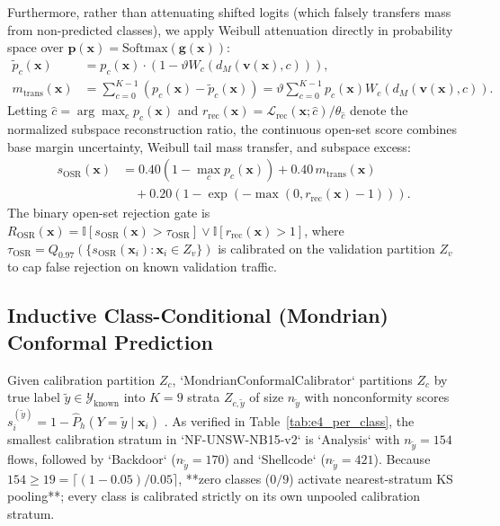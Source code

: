 ﻿\documentclass[conference]{IEEEtran}
\begin{document}
Furthermore, rather than attenuating shifted logits (which falsely transfers mass from non-predicted classes), we apply Weibull attenuation directly in probability space over $\mathbf{p}(\mathbf{x}) = \text{Softmax}(\mathbf{g}(\mathbf{x}))$:
\begin{align}
\tilde{p}_c(\mathbf{x}) &= p_c(\mathbf{x}) \cdot \left(1 - \vartheta W_c(d_M(\mathbf{v}(\mathbf{x}), c))\right), \label{eq:prob_atten} \\
m_{\text{trans}}(\mathbf{x}) &= \sum_{c=0}^{K-1} \left(p_c(\mathbf{x}) - \tilde{p}_c(\mathbf{x})\right) = \vartheta \sum_{c=0}^{K-1} p_c(\mathbf{x}) W_c(d_M(\mathbf{v}(\mathbf{x}), c)). \label{eq:trans_mass}
\end{align}
Letting $\hat{c} = \arg\max_{c} p_c(\mathbf{x})$ and $r_{\text{rec}}(\mathbf{x}) = \mathcal{L}_{\text{rec}}(\mathbf{x}; \hat{c}) / \theta_{\hat{c}}$ denote the normalized subspace reconstruction ratio, the continuous open-set score combines base margin uncertainty, Weibull tail mass transfer, and subspace excess:
\begin{align}
s_{\text{OSR}}(\mathbf{x}) &= 0.40 \left(1 - \max_c p_c(\mathbf{x})\right) + 0.40 \, m_{\text{trans}}(\mathbf{x}) \nonumber \\
&\quad + 0.20 \left(1 - \exp(-\max(0, r_{\text{rec}}(\mathbf{x}) - 1))\right).
\label{eq:osr_score}
\end{align}
The binary open-set rejection gate is $R_{\text{OSR}}(\mathbf{x}) = \mathbb{I}[s_{\text{OSR}}(\mathbf{x}) > \tau_{\text{OSR}}] \lor \mathbb{I}[r_{\text{rec}}(\mathbf{x}) > 1]$, where $\tau_{\text{OSR}} = Q_{0.97}(\{s_{\text{OSR}}(\mathbf{x}_i) : \mathbf{x}_i \in Z_v\})$ is calibrated on the validation partition $Z_v$ to cap false rejection on known validation traffic.

\subsection{Inductive Class-Conditional (Mondrian) Conformal Prediction}
Given calibration partition $Z_c$, `MondrianConformalCalibrator` partitions $Z_c$ by true label $\tilde{y} \in \mathcal{Y}_{\text{known}}$ into $K = 9$ strata $Z_{c,\tilde{y}}$ of size $n_{\tilde{y}}$ with nonconformity scores $s_i^{(\tilde{y})} = 1 - \hat{P}_h(Y = \tilde{y} \mid \mathbf{x}_i)$ \cite{b8,b16}. As verified in Table~\ref{tab:e4_per_class}, the smallest calibration stratum in `NF-UNSW-NB15-v2` is `Analysis` with $n_{\tilde{y}} = 154$ flows, followed by `Backdoor` ($n_{\tilde{y}} = 170$) and `Shellcode` ($n_{\tilde{y}} = 421$). Because $154 \ge 19 = \lceil (1-0.05)/0.05 \rceil$, **zero classes ($0/9$) activate nearest-stratum KS pooling**; every class is calibrated strictly on its own unpooled calibration stratum.
\end{document}
